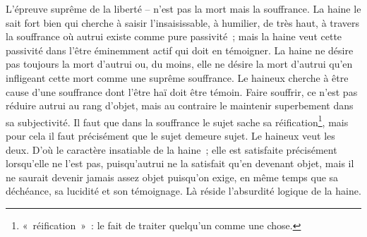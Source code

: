 {L'épreuve suprême de la liberté – n'est pas la mort mais la souffrance. La haine le sait fort bien qui cherche à saisir l'insaisissable, à humilier, de très haut, à travers la souffrance où autrui existe comme pure passivité~; mais la haine veut cette passivité dans l'être éminemment actif qui doit en témoigner. La haine ne désire pas toujours la mort d'autrui ou, du moins, elle ne désire la mort d'autrui qu'en infligeant cette mort comme une suprême souffrance. Le haineux cherche à être cause d'une souffrance dont l'être haï doit être témoin. Faire souffrir, ce n'est pas réduire autrui au rang d'objet, mais au contraire le maintenir superbement dans sa subjectivité. Il faut que dans la souffrance le sujet sache sa réification\footnote{«~réification~»~: le fait de traiter quelqu'un comme une chose.}, mais pour cela il faut précisément que le sujet demeure sujet. Le haineux veut les deux. D'où le caractère insatiable de la haine~; elle est satisfaite précisément lorsqu'elle ne l'est pas, puisqu'autrui ne la satisfait qu'en devenant objet, mais il ne saurait devenir jamais assez objet puisqu'on exige, en même temps que sa déchéance, sa lucidité et son témoignage. Là réside l'absurdité logique de la haine.
}


